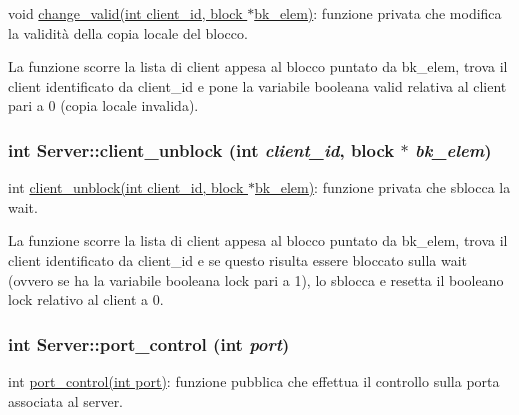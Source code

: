 void \hyperlink{classServer_e44ebbcc399725c379202cee043a468d_e44ebbcc399725c379202cee043a468d}{change\_\-valid(int client\_\-id, block $\ast$bk\_\-elem)}: funzione privata che modifica la validità della copia locale del blocco. 

La funzione scorre la lista di client appesa al blocco puntato da bk\_\-elem, trova il client identificato da client\_\-id e pone la variabile booleana valid relativa al client pari a 0 (copia locale invalida). \hypertarget{classServer_3303875bf7d4884a73d723e232fd927d_3303875bf7d4884a73d723e232fd927d}{
\subsubsection[{client\_\-unblock}]{\setlength{\rightskip}{0pt plus 5cm}int Server::client\_\-unblock (int {\em client\_\-id}, \/  {\bf block} $\ast$ {\em bk\_\-elem})}}
\label{classServer_3303875bf7d4884a73d723e232fd927d_3303875bf7d4884a73d723e232fd927d}


int \hyperlink{classServer_3303875bf7d4884a73d723e232fd927d_3303875bf7d4884a73d723e232fd927d}{client\_\-unblock(int client\_\-id, block $\ast$bk\_\-elem)}: funzione privata che sblocca la wait. 

La funzione scorre la lista di client appesa al blocco puntato da bk\_\-elem, trova il client identificato da client\_\-id e se questo risulta essere bloccato sulla wait (ovvero se ha la variabile booleana lock pari a 1), lo sblocca e resetta il booleano lock relativo al client a 0. \hypertarget{classServer_0abf0fde7783184afc435549217006b3_0abf0fde7783184afc435549217006b3}{
\subsubsection[{port\_\-control}]{\setlength{\rightskip}{0pt plus 5cm}int Server::port\_\-control (int {\em port})}}
\label{classServer_0abf0fde7783184afc435549217006b3_0abf0fde7783184afc435549217006b3}


int \hyperlink{classServer_0abf0fde7783184afc435549217006b3_0abf0fde7783184afc435549217006b3}{port\_\-control(int port)}: funzione pubblica che effettua il controllo sulla porta associata al server. 

